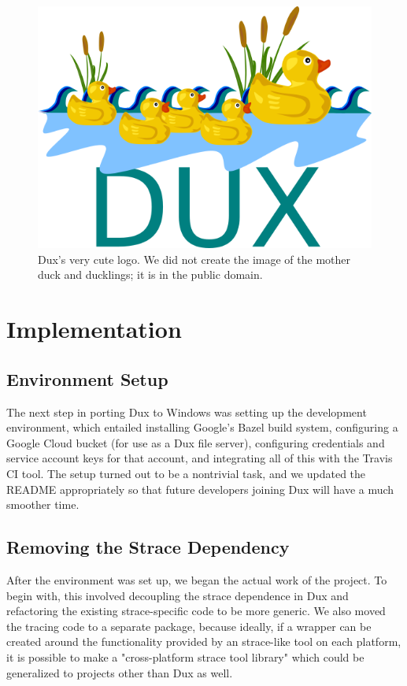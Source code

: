 \documentclass[10pt,conference]{IEEEtran}
\begin{document}
\begin{figure}
\includegraphics[width=\columnwidth]{DUX}
\caption{Dux's very cute logo. We did not create the image of the mother duck and ducklings; it is in the public domain.}
\end{figure}

\section{Implementation}

\subsection{Environment Setup}

The next step in porting Dux to Windows was setting up the development environment,
which entailed installing Google's Bazel build system, configuring a Google Cloud 
bucket (for use as a Dux file server), configuring credentials and service account
keys for that account, and integrating all of this with the Travis CI tool. The setup
turned out to be a nontrivial task, and we updated the README appropriately so
that future developers joining Dux will have a much smoother time.

\subsection{Removing the Strace Dependency}

After the environment was set up, we began the actual work of the project. To
begin with, this involved decoupling the strace dependence in Dux and refactoring the
existing strace-specific code to be more generic. We also moved the tracing code
to a separate package, because ideally, if a wrapper can be created around the
functionality provided by an strace-like tool on each platform, it is possible to
make a "cross-platform strace tool library" which could be generalized to projects
other than Dux as well.
\end{document}
